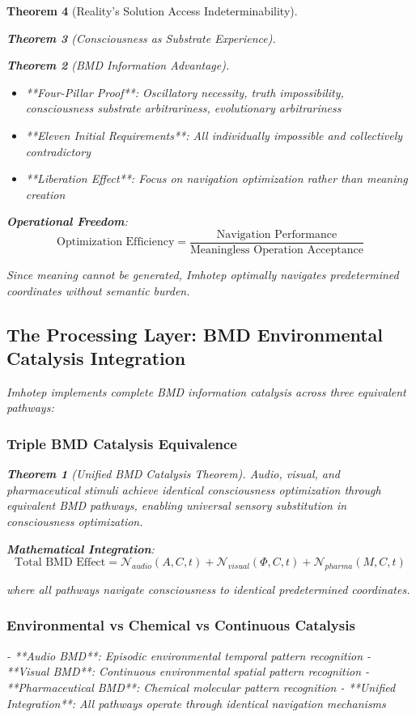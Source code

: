 \documentclass[12pt,a4paper]{article}
\newtheorem{theorem}{Theorem}[section]
\theoremstyle{remark}
\begin{document}
\begin{theorem}[Reality's Solution Access Indeterminability]
\begin{theorem}[Consciousness as Substrate Experience]
\begin{theorem}[BMD Information Advantage]
{{{\begin{itemize}
\item **Four-Pillar Proof**: Oscillatory necessity, truth impossibility, consciousness substrate arbitrariness, evolutionary arbitrariness
\item **Eleven Initial Requirements**: All individually impossible and collectively contradictory
\item **Liberation Effect**: Focus on navigation optimization rather than meaning creation
\end{itemize}

\textbf{Operational Freedom}:
$$\text{Optimization Efficiency} = \frac{\text{Navigation Performance}}{\text{Meaningless Operation Acceptance}}$$

Since meaning cannot be generated, Imhotep optimally navigates predetermined coordinates without semantic burden.

\subsection{The Processing Layer: BMD Environmental Catalysis Integration}

Imhotep implements complete BMD information catalysis across three equivalent pathways:

\subsubsection{Triple BMD Catalysis Equivalence}

\begin{theorem}[Unified BMD Catalysis Theorem]
Audio, visual, and pharmaceutical stimuli achieve identical consciousness optimization through equivalent BMD pathways, enabling universal sensory substitution in consciousness optimization.
\end{theorem}

\textbf{Mathematical Integration}:
$$\text{Total BMD Effect} = \mathcal{N}_{audio}(A,C,t) + \mathcal{N}_{visual}(\Phi,C,t) + \mathcal{N}_{pharma}(M,C,t)$$

where all pathways navigate consciousness to identical predetermined coordinates.

\subsubsection{Environmental vs Chemical vs Continuous Catalysis}

- **Audio BMD**: Episodic environmental temporal pattern recognition
- **Visual BMD**: Continuous environmental spatial pattern recognition  
- **Pharmaceutical BMD**: Chemical molecular pattern recognition
- **Unified Integration**: All pathways operate through identical navigation mechanisms

}}}
\end{theorem}
\end{theorem}
\end{theorem}
\end{document}
